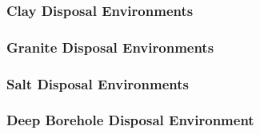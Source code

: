 

\begin{frame}[ctb!]
  \frametitle{Clay Disposal Environments}
  
\end{frame}

\begin{frame}[ctb!]
  \frametitle{Granite Disposal Environments}
  
\end{frame}

\begin{frame}[ctb!]
  \frametitle{Salt Disposal Environments}
  
\end{frame}

\begin{frame}[ctb!]
  \frametitle{Deep Borehole Disposal Environment}
  
\end{frame}
